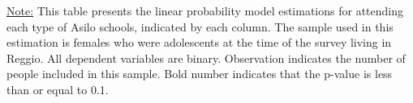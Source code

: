 \begin{footnotesize}
\noindent\underline{Note:} This table presents the linear probability model estimations for attending each type of Asilo schools, indicated by each column. The sample used in this estimation is females who were adolescents at the time of the survey living in Reggio. All dependent variables are binary. Observation indicates the number of people included in this sample. Bold number indicates that the p-value is less than or equal to 0.1.
\end{footnotesize}

